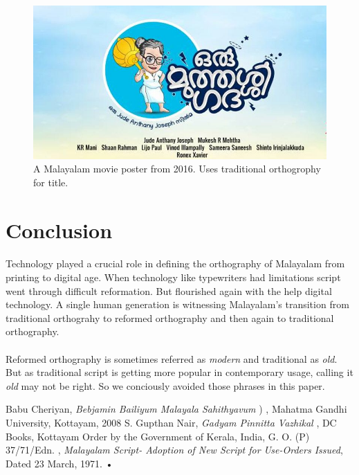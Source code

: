 \documentclass[10pt]{article}
\begin{document}
\begin{figure}[H]
 \centering
  \includegraphics[width=1.0\textwidth]{images/2016-oru-muthashi-gadha}
 \caption{A Malayalam movie poster from 2016. Uses traditional orthogrophy for title.}
\end{figure}

\section{Conclusion}

\paragraph{}
Technology played a crucial role in defining the orthography of Malayalam from printing to digital age. When technology like typewriters had limitations script went through difficult reformation. But flourished again with the help digital technology. A single human generation is witnessing Malayalam's transition from traditional orthograhy to reformed orthography and then again to traditional orthography. 

\paragraph{}
Reformed orthography is sometimes referred as \textit{modern} and traditional as \textit{old}. But as traditional script is getting more popular in contemporary usage, calling it \textit{old} may not be right. So we conciously avoided those phrases in this paper.

\begin{thebibliography}{9}

 Babu Cheriyan, \textit{Bebjamin Bailiyum Malayala Sahithyavum} {) }, Mahatma Gandhi University, Kottayam, 2008
 S. Gupthan Nair, \textit{Gadyam Pinnitta Vazhikal}{ }, DC Books, Kottayam
 Order by the Government of Kerala, India, G. O. (P) 37/71/Edn. , \textit{Malayalam Script- Adoption of New Script for Use-Orders Issued}, Dated 23 March, 1971.
•


\end{thebibliography}
\end{document}
